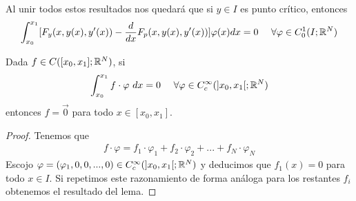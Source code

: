  Al unir todos estos resultados nos quedará que si $y\in I$ es punto crítico, entonces
 \begin{gather*}
    \int_{x_0}^{x_1} [F_y(x, y(x), y'(x)) - \frac{d}{dx}F_p(x, y(x), y'(x))] \varphi(x)dx = 0\ \ \ \ \forall \varphi\in C_0^1(I;\mathbb{R}^N)
 \end{gather*}

 \begin{lema}
    Dada $f\in C([x_0, x_1]; \mathbb{R}^N)$, si 
    \begin{gather*}
        \int_{x_0}^{x_1} f \cdot \varphi \ dx = 0 \ \ \ \ \forall \varphi \in C_c^\infty(]x_0, x_1[; \mathbb{R}^N)
    \end{gather*}
    entonces $f=\vec{0}$ para todo $x\in [x_0, x_1]$.
    \begin{proof}
        Tenemos que 
        \begin{gather*}
            f\cdot \varphi = f_1 \cdot \varphi_1 + f_2 \cdot \varphi_2 + ... + f_N\cdot \varphi_N
        \end{gather*}
        Escojo $\varphi = (\varphi_1, 0, 0, ..., 0) \in C_c^\infty(]x_0, x_1[;\mathbb{R}^N)$ y deducimos que $f_1(x) = 0$ para todo $x\in I$. Si repetimos este razonamiento de forma análoga para los restantes $f_i$ obtenemos el resultado del lema.
    \end{proof}
 \end{lema}

